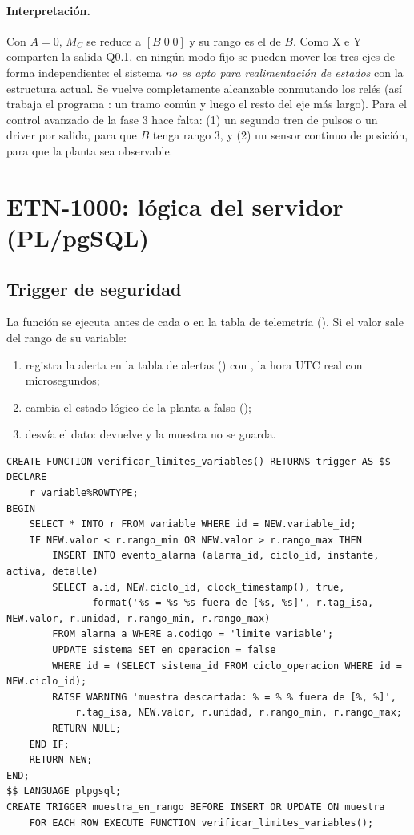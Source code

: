 \documentclass[a4paper,11pt]{article}
\begin{document}
\paragraph{Interpretación.} Con $A = 0$, $M_C$ se reduce a $[B\;0\;0]$ y su rango es el de $B$. Como X e Y comparten la salida Q0.1, en ningún modo fijo se pueden mover los tres ejes de forma independiente: el sistema \emph{no es apto para realimentación de estados} con la estructura actual. Se vuelve completamente alcanzable conmutando los relés (así trabaja el programa : un tramo común y luego el resto del eje más largo). Para el control avanzado de la fase 3 hace falta: (1) un segundo tren de pulsos o un driver por salida, para que $B$ tenga rango 3, y (2) un sensor continuo de posición, para que la planta sea observable.

\section{ETN-1000: lógica del servidor (PL/pgSQL)}
\subsection{Trigger de seguridad}
La función  se ejecuta antes de cada  o  en la tabla de telemetría (). Si el valor sale del rango de su variable:
\begin{enumerate}
\item registra la alerta  en la tabla de alertas () con , la hora UTC real con microsegundos;
\item cambia el estado lógico de la planta a falso ();
\item desvía el dato: devuelve  y la muestra no se guarda.
\end{enumerate}
\begin{lstlisting}[style=sql, caption={Función y trigger (\codigo{database/scripts/brazo\_4gdl.sql}).}]
CREATE FUNCTION verificar_limites_variables() RETURNS trigger AS $$
DECLARE
    r variable%ROWTYPE;
BEGIN
    SELECT * INTO r FROM variable WHERE id = NEW.variable_id;
    IF NEW.valor < r.rango_min OR NEW.valor > r.rango_max THEN
        INSERT INTO evento_alarma (alarma_id, ciclo_id, instante, activa, detalle)
        SELECT a.id, NEW.ciclo_id, clock_timestamp(), true,
               format('%s = %s %s fuera de [%s, %s]', r.tag_isa, NEW.valor, r.unidad, r.rango_min, r.rango_max)
        FROM alarma a WHERE a.codigo = 'limite_variable';
        UPDATE sistema SET en_operacion = false
        WHERE id = (SELECT sistema_id FROM ciclo_operacion WHERE id = NEW.ciclo_id);
        RAISE WARNING 'muestra descartada: % = % % fuera de [%, %]',
            r.tag_isa, NEW.valor, r.unidad, r.rango_min, r.rango_max;
        RETURN NULL;
    END IF;
    RETURN NEW;
END;
$$ LANGUAGE plpgsql;
CREATE TRIGGER muestra_en_rango BEFORE INSERT OR UPDATE ON muestra
    FOR EACH ROW EXECUTE FUNCTION verificar_limites_variables();
\end{lstlisting}
\end{document}
